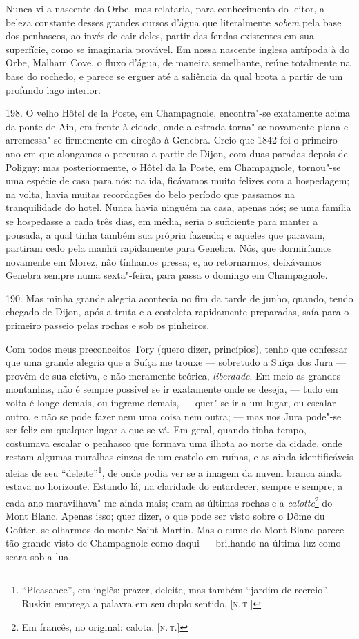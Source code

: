 Nunca vi a nascente do Orbe, mas relataria, para conhecimento do leitor,
a beleza constante desses grandes cursos d'água que literalmente
\emph{sobem} pela base dos penhascos, ao invés de cair deles, partir das
fendas existentes em sua superfície, como se imaginaria provável. Em
nossa nascente inglesa antípoda à do Orbe, Malham Cove, o fluxo d'água,
de maneira semelhante, reúne totalmente na base do rochedo, e parece se
erguer até a saliência da qual brota a partir de um profundo lago
interior.

198. O velho Hôtel de la Poste, em Champagnole, encontra"-se exatamente
acima da ponte de Ain, em frente à cidade, onde a estrada torna"-se
novamente plana e arremessa"-se firmemente em direção à Genebra. Creio
que 1842 foi o primeiro ano em que alongamos o percurso a partir de
Dijon, com duas paradas depois de Poligny; mas posteriormente, o Hôtel
da la Poste, em Champagnole, tornou"-se uma espécie de casa para nós: na
ida, ficávamos muito felizes com a hospedagem; na volta, havia muitas
recordações do belo período que passamos na tranquilidade do hotel.
Nunca havia ninguém na casa, apenas nós; se uma família se hospedasse a
cada três dias, em média, seria o suficiente para manter a pousada, a
qual tinha também sua própria fazenda; e aqueles que paravam, partiram
cedo pela manhã rapidamente para Genebra. Nós, que dormiríamos novamente
em Morez, não tínhamos pressa; e, ao retornarmos, deixávamos Genebra
sempre numa sexta"-feira, para passa o domingo em Champagnole.

190. Mas minha grande alegria acontecia no fim da tarde de junho,
quando, tendo chegado de Dijon, após a truta e a costeleta rapidamente
preparadas, saía para o primeiro passeio pelas rochas e sob os
pinheiros.

Com todos meus preconceitos Tory (quero dizer, princípios), tenho que
confessar que uma grande alegria que a Suíça me trouxe --- sobretudo a
Suíça dos Jura --- provém de sua efetiva, e não meramente teórica,
\emph{liberdade}. Em meio as grandes montanhas, não é sempre possível se
ir exatamente onde se deseja, --- tudo em volta é longe demais, ou
íngreme demais, --- quer"-se ir a um lugar, ou escalar outro, e não se
pode fazer nem uma coisa nem outra; --- mas nos Jura pode"-se ser feliz em
qualquer lugar a que se vá. Em geral, quando tinha tempo, costumava
escalar o penhasco que formava uma ilhota ao norte da cidade, onde
restam algumas muralhas cinzas de um castelo em ruínas, e as ainda
identificáveis aleias de seu ``deleite''\footnote{``Pleasance'', em
  inglês: prazer, deleite, mas também ``jardim de recreio''. Ruskin
  emprega a palavra em seu duplo sentido. {[}\textsc{n.\,t.}{]}}, de onde podia
ver se a imagem da nuvem branca ainda estava no horizonte. Estando lá,
na claridade do entardecer, sempre e sempre, a cada ano maravilhava"-me
ainda mais; eram as últimas rochas e a \emph{calotte}\footnote{Em
  francês, no original: calota. {[}\textsc{n.\,t.}{]}} do Mont Blanc. Apenas
isso; quer dizer, o que pode ser visto sobre o Dôme du Goûter, se
olharmos do monte Saint Martin. Mas o cume do Mont Blanc parece tão
grande visto de Champagnole como daqui --- brilhando na última luz como
seara sob a lua.

